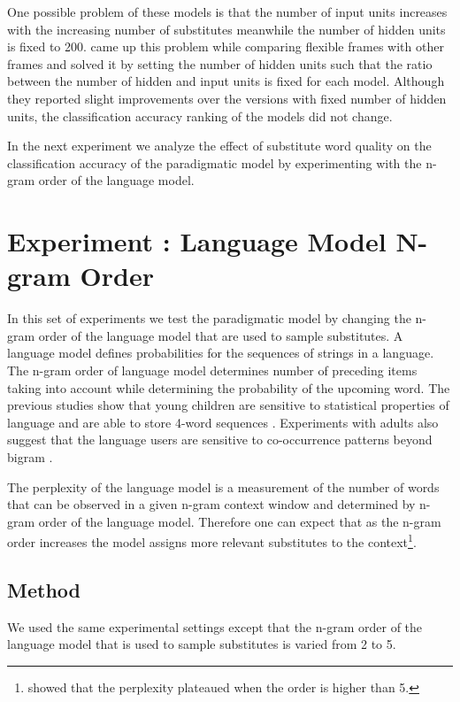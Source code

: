 
One possible problem of these models is that the number of
input units increases with the increasing number of substitutes meanwhile the
number of hidden units is fixed to 200. \cite{clair2010} came up this problem
while comparing flexible frames with other frames and solved it by setting the
number of hidden units such that the ratio between the number of hidden and
input units is fixed for each model.  Although they reported slight
improvements over the versions with fixed number of hidden units, the
classification accuracy ranking of the models did not change. 

In the next experiment we analyze the effect of substitute word quality on the
classification accuracy of the paradigmatic model by experimenting with
the n-gram order of the language model.

\section{Experiment : Language Model N-gram Order}
\label{s:exp_ngram}

In this set of experiments we test the paradigmatic model by changing the n-gram order of the language model that are
used to sample substitutes. A language model defines probabilities for the sequences of strings in a language.
The n-gram order of language model determines number of preceding items taking into account
while determining the probability of the upcoming word. The previous studies
show that young children are sensitive to statistical properties of language \cite{saffran1996statistical}
and are able to store 4-word sequences \cite{bannard2008stored}. Experiments
with adults also suggest that the language users are sensitive to co-occurrence
patterns beyond bigram \cite{arnon2010more}.

The perplexity of the language model is a measurement of the 
number of words that can be observed in a given n-gram
context window and determined by n-gram order of the language model.  Therefore one can expect that as the n-gram order increases the model assigns more relevant substitutes to the
context\footnote{\cite{Goodman2001403} showed that the perplexity plateaued when
the order is higher than 5.}. 

\subsection{Method}
We used the same experimental settings except that the n-gram order of the
language model that is used to sample substitutes is varied from 2 to
5. 

